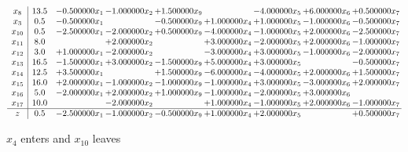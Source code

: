 \documentclass[10pt]{article}
\begin{document}
 \[\begin{array}{c| c c@{\hskip 2pt} c@{\hskip 2pt} c@{\hskip 2pt} c@{\hskip 2pt} c@{\hskip 2pt} c@{\hskip 2pt} c@{\hskip 2pt} }
 x_{8}   &  13.5 & -0.500000 x_{1} & -1.000000 x_{2} & + 1.500000 x_{9} &   & -4.000000 x_{5} & + 6.000000 x_{6} & + 0.500000 x_{7}\\
 x_{3}   &  0.5 & -0.500000 x_{1} &   & -0.500000 x_{9} & + 1.000000 x_{4} & + 1.000000 x_{5} & -1.000000 x_{6} & -0.500000 x_{7}\\
 x_{10}   &  0.5 & -2.500000 x_{1} & -2.000000 x_{2} & + 0.500000 x_{9} & -4.000000 x_{4} & -1.000000 x_{5} & + 2.000000 x_{6} & -2.500000 x_{7}\\
 x_{11}   &  8.0  &   & + 2.000000 x_{2} &   & + 3.000000 x_{4} & -2.000000 x_{5} & + 2.000000 x_{6} & -1.000000 x_{7}\\
 x_{12}   &  3.0 & + 1.000000 x_{1} & -2.000000 x_{2} &   & -3.000000 x_{4} & + 3.000000 x_{5} & -1.000000 x_{6} & -2.000000 x_{7}\\
 x_{13}   &  16.5 & -1.500000 x_{1} & + 3.000000 x_{2} & -1.500000 x_{9} & + 5.000000 x_{4} & + 3.000000 x_{5} &   & -0.500000 x_{7}\\
 x_{14}   &  12.5 & + 3.500000 x_{1} &   & + 1.500000 x_{9} & -6.000000 x_{4} & -4.000000 x_{5} & + 2.000000 x_{6} & + 1.500000 x_{7}\\
 x_{15}   &  16.0 & + 2.000000 x_{1} & -1.000000 x_{2} & -1.000000 x_{9} & -1.000000 x_{4} & + 3.000000 x_{5} & -3.000000 x_{6} & + 2.000000 x_{7}\\
 x_{16}   &  5.0 & -2.000000 x_{1} & + 2.000000 x_{2} & + 1.000000 x_{9} & -1.000000 x_{4} & -2.000000 x_{5} & + 3.000000 x_{6} &   \\
 x_{17}   &  10.0  &   & -2.000000 x_{2} &   & + 1.000000 x_{4} & -1.000000 x_{5} & + 2.000000 x_{6} & -1.000000 x_{7}\\
\hline
z    &  0.5 & -2.500000 x_{1} & -1.000000 x_{2} & -0.500000 x_{9} & + 1.000000 x_{4} & + 2.000000 x_{5} &   & + 0.500000 x_{7}\\
\end{array}\]


 $ x_{4} $ enters and $ x_{10} $ leaves 
\end{document}
